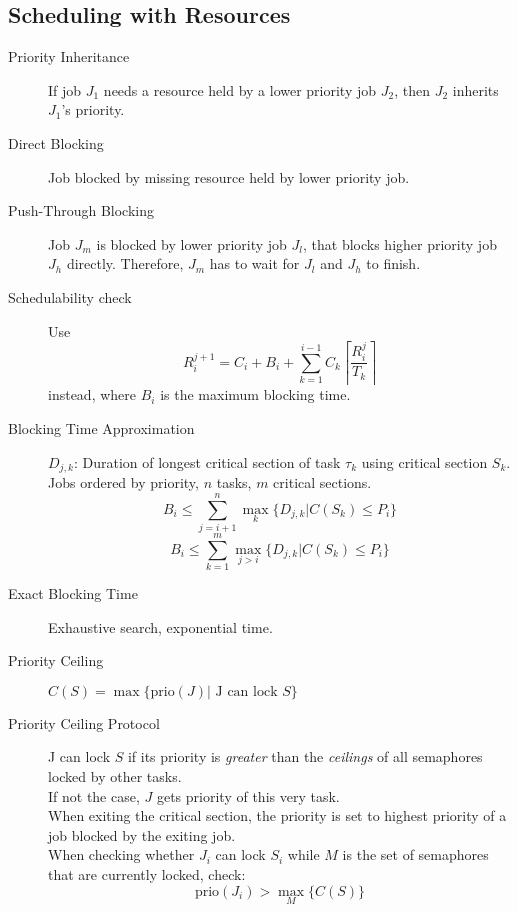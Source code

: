 \subsection{Scheduling with Resources}

\begin{description}
	\item[Priority Inheritance] If job $J_1$ needs a resource held by a lower
	priority job $J_2$, then $J_2$ inherits $J_1$'s priority.
	\item[Direct Blocking] Job blocked by missing resource held by lower priority
	job.
	\item[Push-Through Blocking] Job $J_m$ is blocked by lower priority job $J_l$,
	that blocks higher priority job $J_h$ directly. Therefore, $J_m$ has to wait
	for $J_l$ and $J_h$ to finish.
	\item[Schedulability check] Use 
	\[ R_i^{j+1} = C_i + B_i + \sum_{k=1}^{i-1} C_k \left\lceil \frac{R_i^j}
	{T_k} \right\rceil\]
	instead, where $B_i$ is the maximum blocking time.
	\item[Blocking Time Approximation] $D_{j,k}$: Duration of longest critical
	section of task $\tau_k$ using critical section $S_k$.\\
	Jobs ordered by priority, $n$ tasks, $m$ critical sections.
	\[ B_i \leq \sum_{j = i+1}^n \max_k\{ D_{j,k} | C(S_k) \leq P_i \} \]
	\[ B_i \leq \sum_{k = 1}^m \max_{j>i}\{ D_{j,k} | C(S_k) \leq P_i \} \]
	\item[Exact Blocking Time] Exhaustive search, exponential time.
	\item[Priority Ceiling] $C(S) = \max\{\text{prio}(J)|\text{ J can lock } S \}$
	\item[Priority Ceiling Protocol] J can lock $S$ if its priority is \emph
	{greater} than the \emph{ceilings} of all semaphores locked by other tasks.\\
	If not the case, $J$ gets priority of this very task.\\
	When exiting the critical section, the priority is set to highest priority of a
	job blocked by the exiting job.\\
	When checking whether $J_i$ can lock $S_i$ while $M$ is the set of semaphores that are currently locked, check: 
	\[ \text{prio}(J_i) > \max_M\{C(S)\} \]
\end{description}

